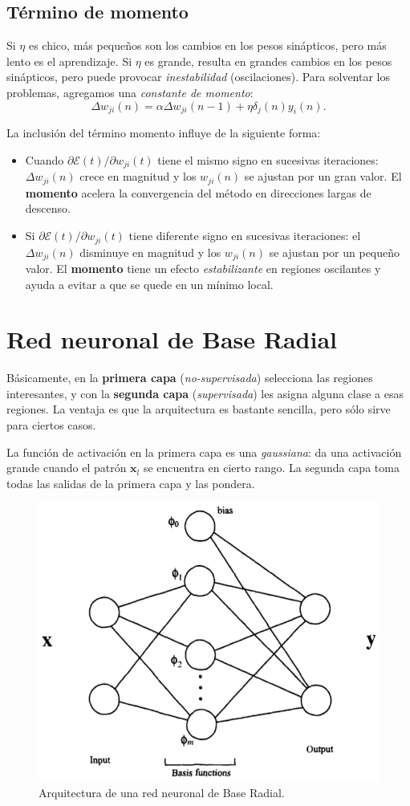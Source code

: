 \documentclass[10pt,a4paper]{article}
\begin{document}
\subsection{Término de momento}
Si $\eta$ es chico, más pequeños son los cambios en los pesos sinápticos, pero más lento es el aprendizaje. Si $\eta$ es grande, resulta en grandes cambios en los pesos sinápticos, pero puede provocar \textit{inestabilidad} (oscilaciones). Para solventar los problemas, agregamos una \textit{constante de momento}:
\[\Delta w_{ji}(n)=\alpha \Delta w_{ji}(n-1)+\eta \delta_j(n)y_i(n).\]

La inclusión del término momento influye de la siguiente forma:
\begin{itemize}
\item Cuando $\partial \mathcal{E} (t) / \partial w_{ji}(t)$ tiene el mismo signo en sucesivas iteraciones: $\Delta w_{ji}(n)$ crece en magnitud y los $w_{ji}(n)$ se ajustan por un gran valor. El \textbf{momento} acelera la convergencia del método en direcciones largas de descenso.
\item Si $\partial \mathcal{E} (t) / \partial w_{ji}(t)$ tiene diferente signo en sucesivas iteraciones: el $\Delta w_{ji}(n)$ disminuye en magnitud y los $w_{ji}(n)$ se ajustan por un pequeño valor. El \textbf{momento} tiene un efecto \textit{estabilizante} en regiones oscilantes y ayuda a evitar a que se quede en un mínimo local.
\end{itemize}

\section{Red neuronal de Base Radial}

Básicamente, en la \textbf{primera capa} (\textit{no-supervisada}) selecciona las regiones interesantes, y con la \textbf{segunda capa} (\textit{supervisada}) les asigna alguna clase a esas regiones. La ventaja es que la arquitectura es bastante sencilla, pero sólo sirve para ciertos casos.

La función de activación en la primera capa es una \textit{gaussiana}: da una activación grande cuando el patrón $\mathbf{x}_l$ se encuentra en cierto rango. La segunda capa toma todas las salidas de la primera capa y las pondera.

\begin{figure}
  \label{fig:radial}
  \caption{Arquitectura de una red neuronal de Base Radial.}
  \centering
  \hbox{\includegraphics[width=0.5\textwidth-\fboxrule-\fboxrule]{radial.png}}  
\end{figure}	
\end{document}
